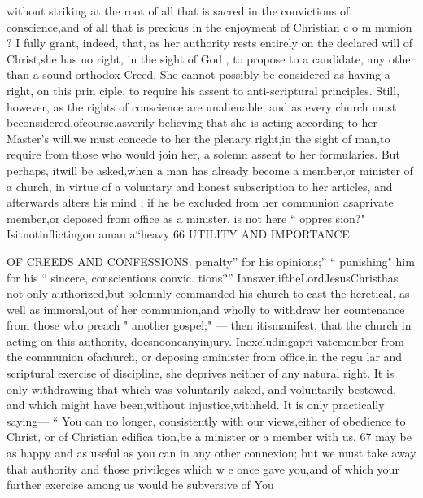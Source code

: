 \documentclass[
]{book}
\begin{document}
without striking at the root of all that is sacred in the convictions of conscience,and of all that
is precious in the enjoyment of Christian c o m munion ? I fully grant, indeed, that, as her authority rests entirely on the declared will of
Christ,she has no right, in the sight of God ,
to propose to a candidate, any other than a
sound orthodox Creed. She cannot possibly
be considered as having a right, on this prin
ciple, to require his assent to anti-scriptural
principles. Still, however, as the rights of conscience are unalienable; and as every
church must beconsidered,ofcourse,asverily
believing that she is acting according to her Master's will,we must concede to her the
plenary right,in the sight of man,to require from those who would join her, a solemn assent to her formularies.
But perhaps, itwill be asked,when a man has already become a member,or minister of a church, in virtue of a voluntary and honest subscription to her articles, and afterwards
alters his mind ; if he be excluded from her communion asaprivate member,or deposed
from office as a minister, is not here `` oppres sion?" Isitnotinflictingon aman a``heavy
66 UTILITY AND IMPORTANCE

OF CREEDS AND CONFESSIONS.
penalty'' for his opinions;'' `` punishing" him for his `` sincere, conscientious convic. tions?'' Ianswer,iftheLordJesusChristhas not only authorized,but solemnly commanded
his church to cast the heretical, as well as
immoral,out of her communion,and wholly to withdraw her countenance from those who
preach " another gospel;" --- then itismanifest,
that the church in acting on this authority, doesnooneanyinjury. Inexcludingapri vatemember from the communion ofachurch, or deposing aminister from office,in the regu lar and scriptural exercise of discipline, she deprives neither of any natural right. It is
only withdrawing that which was voluntarily asked, and voluntarily bestowed, and which
might have been,without injustice,withheld. It is only practically saying--- `` You can no longer, consistently with our views,either of obedience to Christ, or of Christian edifica tion,be a minister or a member with us.
67
may be as happy and as useful as you can in
any other connexion; but we must take away that authority and those privileges which w e once gave you,and of which your further exercise among us would be subversive of
You
\end{document}
